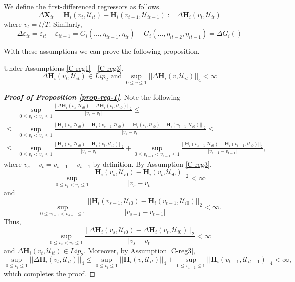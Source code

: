 We define the first-differenced regressors as follows.
\[ \Delta \mathbf{X}_{it} =\mathbf{H}_i(v_t, \mathcal{U}_{it}) - \mathbf{H}_i(v_{t-1}, \mathcal{U}_{it-1}) := \Delta \mathbf{H}_i(v_t, \mathcal{U}_{it}) \]
where $v_t = t/T$. Similarly, 
\[\Delta \varepsilon_{it} = \varepsilon_{it} - \varepsilon_{it-1} = G_i(\ldots, \eta_{it-1}, \eta_{it}) - G_i(\ldots, \eta_{it-2}, \eta_{it-1}) = \Delta G_i()
\]
 
With these assumptions we can prove the following proposition.
\begin{prop}\label{prop-reg-1}
Under Assumptions \ref{C-reg1} - \ref{C-reg3},
\[ \Delta \mathbf{H}_i(v_t, \mathcal{U}_{it}) \in Lip_2 \text{ and } \sup_{0\leq v \leq 1} || \Delta \mathbf{H}_i(v, \mathcal{U}_{it})||_4 < \infty
\]
\end{prop}

\begin{proof}[\textnormal{\textbf{Proof of Proposition \ref{prop-reg-1}}}]
Note the following 
\begin{align*}
&\sup_{0\leq v_t < v_s \leq 1} \frac{||\Delta \mathbf{H}_i(v_s, \mathcal{U}_{i0}) - \Delta \mathbf{H}_i(v_t, \mathcal{U}_{i0}) ||_2}{|v_s - v_t|} \leq \\
\leq &\sup_{0\leq v_t < v_s \leq 1} \frac{||\mathbf{H}_i(v_s, \mathcal{U}_{i0}) - \mathbf{H}_i(v_{s-1}, \mathcal{U}_{i0}) - |\mathbf{H}_i(v_t, \mathcal{U}_{i0}) - \mathbf{H}_i(v_{t-1}, \mathcal{U}_{i0})| ||_2}{|v_s - v_t|} \leq\\
\leq &\sup_{0\leq v_t < v_s \leq 1} \frac{||\mathbf{H}_i(v_s, \mathcal{U}_{i0}) - \mathbf{H}_i(v_t, \mathcal{U}_{i0}) ||_2}{|v_s - v_t|} + \sup_{0\leq v_{t-1} < v_{s-1} \leq 1} \frac{||\mathbf{H}_i(v_{s-1}, \mathcal{U}_{i0}) - \mathbf{H}_i(v_{t-1}, \mathcal{U}_{i0}) ||_2}{|v_{s-1} - v_{t-1}|},
\end{align*}
where $v_s - v_t = v_{s-1} - v_{t-1}$ by definition. By Assumption \ref{C-reg3},
\[\sup_{0\leq v_t < v_s \leq 1} \frac{||\mathbf{H}_i(v_s, \mathcal{U}_{i0}) - \mathbf{H}_i(v_t, \mathcal{U}_{i0}) ||_2}{|v_s - v_t|} < \infty
\]
and 
\[\sup_{0\leq v_{t-1} < v_{s-1} \leq 1} \frac{||\mathbf{H}_i(v_{s-1}, \mathcal{U}_{i0}) - \mathbf{H}_i(v_{t-1}, \mathcal{U}_{i0}) ||_2}{|v_{s-1} - v_{t-1}|} < \infty.
\]
Thus, 
\[
\sup_{0\leq v_t < v_s \leq 1} \frac{||\Delta \mathbf{H}_i(v_s, \mathcal{U}_{i0}) - \Delta \mathbf{H}_i(v_t, \mathcal{U}_{i0}) ||_2}{|v_s - v_t|} < \infty
\]
and $\Delta \mathbf{H}_i(v_t, \mathcal{U}_{it}) \in Lip_2$. Moreover, by Assumption \ref{C-reg3},
\[
 \sup_{0\leq v_t \leq 1} || \Delta \mathbf{H}_i(v_t, \mathcal{U}_{it})||_4 \leq  \sup_{0\leq v_t \leq 1} ||\mathbf{H}_i(v, \mathcal{U}_{it})||_4 +  \sup_{0\leq v_{t-1} \leq 1} || \mathbf{H}_i(v_{t-1}, \mathcal{U}_{it-1})||_4 < \infty,
\]
which completes the proof.
\end{proof} 

